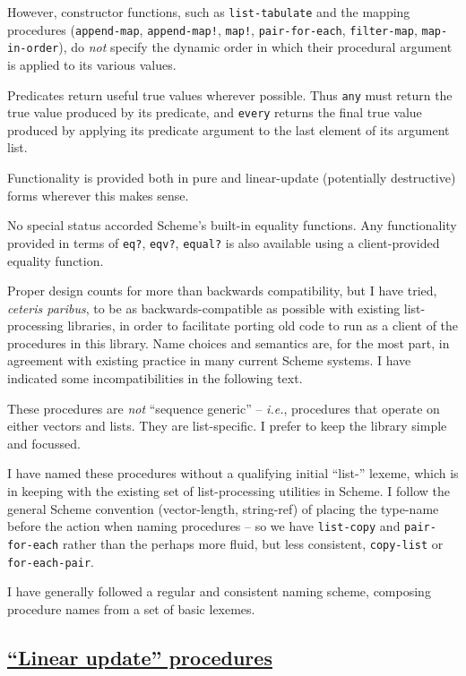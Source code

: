However, constructor functions, such as \texttt{list-tabulate} and the
mapping procedures (\texttt{append-map}, \texttt{append-map!},
\texttt{map!}, \texttt{pair-for-each}, \texttt{filter-map},
\texttt{map-in-order}), do \emph{not} specify the dynamic order in which
their procedural argument is applied to its various values.

Predicates return useful true values wherever possible. Thus
\texttt{any} must return the true value produced by its predicate, and
\texttt{every} returns the final true value produced by applying its
predicate argument to the last element of its argument list.

Functionality is provided both in pure and linear-update (potentially
destructive) forms wherever this makes sense.

No special status accorded Scheme's built-in equality functions. Any
functionality provided in terms of \texttt{eq?}, \texttt{eqv?},
\texttt{equal?} is also available using a client-provided equality
function.

Proper design counts for more than backwards compatibility, but I have
tried, \emph{ceteris paribus}, to be as backwards-compatible as possible
with existing list-processing libraries, in order to facilitate porting
old code to run as a client of the procedures in this library. Name
choices and semantics are, for the most part, in agreement with existing
practice in many current Scheme systems. I have indicated some
incompatibilities in the following text.

These procedures are \emph{not} ``sequence generic'' -- \emph{i.e.},
procedures that operate on either vectors and lists. They are
list-specific. I prefer to keep the library simple and focussed.

I have named these procedures without a qualifying initial ``list-''
lexeme, which is in keeping with the existing set of list-processing
utilities in Scheme. I follow the general Scheme convention
(vector-length, string-ref) of placing the type-name before the action
when naming procedures -- so we have \texttt{list-copy} and
\texttt{pair-for-each} rather than the perhaps more fluid, but less
consistent, \texttt{copy-list} or \texttt{for-each-pair}.

I have generally followed a regular and consistent naming scheme,
composing procedure names from a set of basic lexemes.

\subsection{\texorpdfstring{\href{}{``Linear update''
procedures}}{Linear update procedures}}\label{linear-update-procedures}

